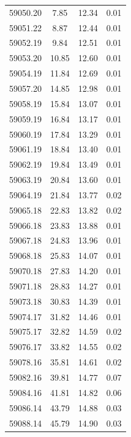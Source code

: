 \begin{longtable}{|c|c|c|c|}
 59050.20 &    7.85 &       12.34 &          0.01 \\
 59051.22 &    8.87 &       12.44 &          0.01 \\
 59052.19 &    9.84 &       12.51 &          0.01 \\
 59053.20 &   10.85 &       12.60 &          0.01 \\
 59054.19 &   11.84 &       12.69 &          0.01 \\
 59057.20 &   14.85 &       12.98 &          0.01 \\
 59058.19 &   15.84 &       13.07 &          0.01 \\
 59059.19 &   16.84 &       13.17 &          0.01 \\
 59060.19 &   17.84 &       13.29 &          0.01 \\
 59061.19 &   18.84 &       13.40 &          0.01 \\
 59062.19 &   19.84 &       13.49 &          0.01 \\
 59063.19 &   20.84 &       13.60 &          0.01 \\
 59064.19 &   21.84 &       13.77 &          0.02 \\
 59065.18 &   22.83 &       13.82 &          0.02 \\
 59066.18 &   23.83 &       13.88 &          0.01 \\
 59067.18 &   24.83 &       13.96 &          0.01 \\
 59068.18 &   25.83 &       14.07 &          0.01 \\
 59070.18 &   27.83 &       14.20 &          0.01 \\
 59071.18 &   28.83 &       14.27 &          0.01 \\
 59073.18 &   30.83 &       14.39 &          0.01 \\
 59074.17 &   31.82 &       14.46 &          0.01 \\
 59075.17 &   32.82 &       14.59 &          0.02 \\
 59076.17 &   33.82 &       14.55 &          0.02 \\
 59078.16 &   35.81 &       14.61 &          0.02 \\
 59082.16 &   39.81 &       14.77 &          0.07 \\
 59084.16 &   41.81 &       14.82 &          0.06 \\
 59086.14 &   43.79 &       14.88 &          0.03 \\
 59088.14 &   45.79 &       14.90 &          0.03 \\

\end{longtable}
